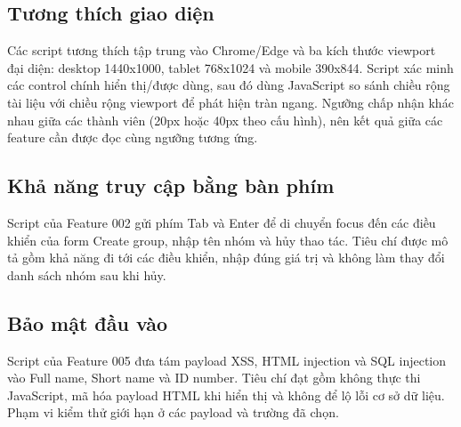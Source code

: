 \subsection{Tương thích giao diện}
Các script tương thích tập trung vào Chrome/Edge và ba kích thước viewport đại diện: desktop 1440x1000, tablet 768x1024 và mobile 390x844. Script xác minh các control chính hiển thị/được dùng, sau đó dùng JavaScript so sánh chiều rộng tài liệu với chiều rộng viewport để phát hiện tràn ngang. Ngưỡng chấp nhận khác nhau giữa các thành viên (20px hoặc 40px theo cấu hình), nên kết quả giữa các feature cần được đọc cùng ngưỡng tương ứng.

\subsection{Khả năng truy cập bằng bàn phím}
Script của Feature 002 gửi phím Tab và Enter để di chuyển focus đến các điều khiển của form Create group, nhập tên nhóm và hủy thao tác. Tiêu chí được mô tả gồm khả năng đi tới các điều khiển, nhập đúng giá trị và không làm thay đổi danh sách nhóm sau khi hủy.

\subsection{Bảo mật đầu vào}
Script của Feature 005 đưa tám payload XSS, HTML injection và SQL injection vào Full name, Short name và ID number. Tiêu chí đạt gồm không thực thi JavaScript, mã hóa payload HTML khi hiển thị và không để lộ lỗi cơ sở dữ liệu. Phạm vi kiểm thử giới hạn ở các payload và trường đã chọn.
